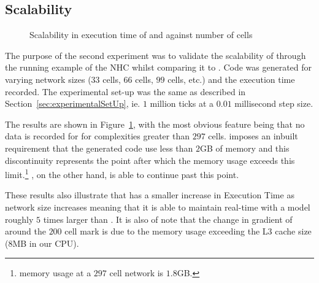 \subsection{Scalability}

\begin{figure}[htbp]
	\centering
	
	\caption{Scalability in  execution time of \simulink and \ourTool against number of cells}
	\label{fig:scalability}
\end{figure}

The purpose of the second experiment was to validate the scalability of \ourTool through the running example of the \ac{NHC} whilst comparing it to \simulink.
Code was generated for varying network sizes ($33$ cells, $66$ cells, $99$ cells, etc.) and the execution time recorded.
The experimental set-up was the same as described in Section~\ref{sec:experimentalSetUp}, ie. $1$ million ticks at a $0.01$ millisecond step size.

The results are shown in Figure~\ref{fig:scalability}, with the most obvious feature being that no data is recorded for \simulink for complexities greater than $297$ cells.
\simulink imposes an inbuilt requirement that the generated code use less than $2$GB of memory and this discontinuity represents the point after which the memory usage exceeds this limit.\footnote{\simulink memory usage at a $297$ cell network is $1.8$GB.}
\ourTool, on the other hand, is able to continue past this point.

These results also illustrate that \ourTool has a smaller increase in Execution Time as network size increases meaning that it is able to maintain real-time with a model roughly $5$ times larger than \simulink.
It is also of note that the change in gradient of \ourTool around the $200$ cell mark is due to the memory usage exceeding the L$3$ cache size ($8$MB in our CPU).